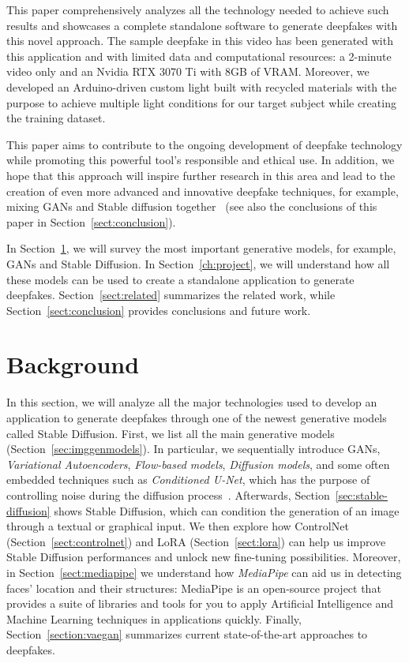 \documentclass[preprint]{elsarticle}
\begin{document}
This paper comprehensively analyzes all the technology needed to achieve such results and showcases a complete standalone software to generate deepfakes with this novel approach. The sample deepfake in this video has been generated with this application and with limited data and computational resources: a 2-minute video only and an Nvidia RTX 3070 Ti with $8$GB of VRAM. Moreover, we developed an Arduino-driven custom light built with recycled materials with the purpose to 
achieve multiple light conditions for our target subject while creating the training dataset.

This paper aims to contribute to the ongoing development of 
deepfake technology while promoting this powerful tool's responsible and ethical use.  In addition, we hope that this approach will inspire further research in this area and lead to the creation of even more advanced and innovative deepfake techniques, for example, mixing GANs and Stable diffusion together~\cite{mix} (see also the conclusions of this paper in Section~\ref{sect:conclusion}).



In Section~\ref{sect:background}, we will survey the most important generative models, for example, GANs and Stable Diffusion.
In Section~\ref{ch:project}, we will understand how all these models can be used to create a standalone application to generate deepfakes. Section~\ref{sect:related} summarizes the related work, while Section~\ref{sect:conclusion} provides conclusions and future work.


\section{Background}\label{sect:background}


In this section, we will analyze all the major technologies used to develop an application to generate 
deepfakes through one of the newest generative models called Stable Diffusion. First, we list all the main generative models (Section~\ref{sec:imggenmodels}). In particular, we sequentially introduce GANs, \emph{Variational Autoencoders}, \emph{Flow-based models}, \emph{Diffusion models}, and some often embedded techniques such as \emph{Conditioned U-Net}, which has the purpose of controlling noise during the diffusion process~\cite{conditionedunet}.
Afterwards, Section~\ref{sec:stable-diffusion} shows  Stable Diffusion, which can condition the 
generation of an image through a textual or graphical input.
We  then explore how ControlNet  (Section~\ref{sect:controlnet}) and LoRA (Section~\ref{sect:lora}) can help us improve Stable Diffusion performances and unlock new fine-tuning possibilities. 
Moreover, in Section~\ref{sect:mediapipe} we  understand how \emph{MediaPipe} can aid us in detecting faces' location and their structures: MediaPipe  is an open-source project that provides a suite of libraries and tools for you to apply Artificial Intelligence and Machine Learning techniques in applications quickly.
Finally, Section~\ref{section:vaegan}  summarizes current state-of-the-art approaches to deepfakes.
\end{document}
